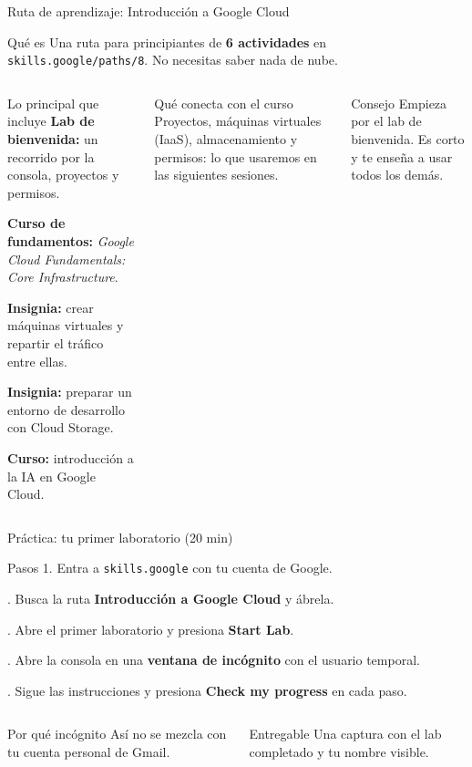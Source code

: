\documentclass[aspectratio=169,10pt,c]{beamer}
\begin{document}
\begin{frame}{Ruta de aprendizaje: Introducción a Google Cloud}
\begin{block}{Qué es}
\small Una ruta para principiantes de \textbf{6 actividades} en \texttt{skills.google/paths/8}. No necesitas saber nada de nube.
\end{block}
\begin{columns}[T,onlytextwidth]
\begin{exampleblock}{Lo principal que incluye}
\small
\textbf{Lab de bienvenida:} un recorrido por la consola, proyectos y permisos.\par\smallskip
\textbf{Curso de fundamentos:} \emph{Google Cloud Fundamentals: Core Infrastructure}.\par\smallskip
\textbf{Insignia:} crear máquinas virtuales y repartir el tráfico entre ellas.\par\smallskip
\textbf{Insignia:} preparar un entorno de desarrollo con Cloud Storage.\par\smallskip
\textbf{Curso:} introducción a la IA en Google Cloud.
\end{exampleblock}
\begin{block}{Qué conecta con el curso}
\small Proyectos, máquinas virtuales (IaaS), almacenamiento y permisos: lo que usaremos en las siguientes sesiones.
\end{block}
\begin{alertblock}{Consejo}
\small Empieza por el lab de bienvenida. Es corto y te enseña a usar todos los demás.
\end{alertblock}
\end{columns}
\end{frame}

\begin{frame}{Práctica: tu primer laboratorio \textnormal{\small(20 min)}}
\begin{block}{Pasos}
\small
1. Entra a \texttt{skills.google} con tu cuenta de Google.\par{}. Busca la ruta \textbf{Introducción a Google Cloud} y ábrela.\par{}. Abre el primer laboratorio y presiona \textbf{Start Lab}.\par{}. Abre la consola en una \textbf{ventana de incógnito} con el usuario temporal.\par{}. Sigue las instrucciones y presiona \textbf{Check my progress} en cada paso.
\end{block}
\begin{columns}[T,onlytextwidth]
\begin{exampleblock}{Por qué incógnito}
\small Así no se mezcla con tu cuenta personal de Gmail.
\end{exampleblock}
\begin{alertblock}{Entregable}
\small Una captura con el lab completado y tu nombre visible.
\end{alertblock}
\end{columns}
\end{frame}
\end{document}
